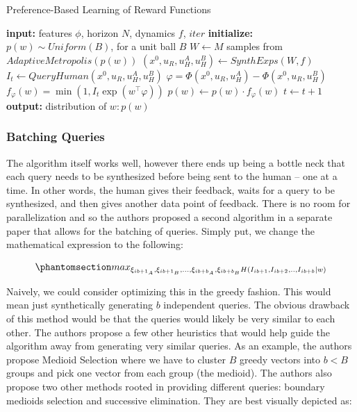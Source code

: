 \documentclass[
  letterpaper,
  numbers=noenddot,
  DIV=11]{scrreprt}
\theoremstyle{definition}
\theoremstyle{plain}
\theoremstyle{plain}
\theoremstyle{remark}
\begin{document}
\begin{algorithm}[H]
\caption{Preference-Based Learning of Reward Functions}
\label{alg-design}
\begin{algorithmic}[1]
    \State \textbf{input:} features $\phi$, horizon $N$, dynamics $f$, $iter$
    \State \textbf{initialize:} $p(w) \sim Uniform(B)$, for a unit ball $B$
        \State $W \gets M$ samples from $AdaptiveMetropolis(p(w))$
        \State $(x^0, u_R, u^A_H, u^B_H) \gets SynthExps(W,f)$
        \State $I_t \gets QueryHuman(x^0, u_R, u^A_H, u^B_H)$
        \State $\varphi = \Phi(x^0, u_R, u^A_H) - \Phi(x^0, u_R, u^B_H)$
        \State $f_\varphi(w) = \min(1, I_t\exp(w^\top \varphi))$
        \State $p(w) \gets p(w) \cdot f_\varphi(w)$
        \State $t \gets t+1$
    \EndWhile
    \State \textbf{output:} distribution of $w: p(w)$
\end{algorithmic}
\end{algorithm}

\subsubsection*{Batching Queries}\label{batching-queries}

The algorithm itself works well, however there ends up being a bottle
neck that each query needs to be synthesized before being sent to the
human -- one at a time. In other words, the human gives their feedback,
waits for a query to be synthesized, and then gives another data point
of feedback. There is no room for parallelization and so the authors
proposed a second algorithm in a separate paper that allows for the
batching of queries. Simply put, we change the mathematical expression
to the following:

\begin{equation}\phantomsection\label{eq-eq3.44}{max_{\xi_{ib+1_A}, \xi_{ib+1_B}, ... , \xi_{ib+b_A}, \xi_{ib+b_B} H(I_{ib+1}, I_{ib+2}, .., I_{ib+b} | w)}}\end{equation}

Naively, we could consider optimizing this in the greedy fashion. This
would mean just synthetically generating \(b\) independent queries. The
obvious drawback of this method would be that the queries would likely
be very similar to each other. The authors propose a few other
heuristics that would help guide the algorithm away from generating very
similar queries. As an example, the authors propose Medioid Selection
where we have to cluster \(B\) greedy vectors into \(b < B\) groups and
pick one vector from each group (the medioid). The authors also propose
two other methods rooted in providing different queries: boundary
medioids selection and successive elimination. They are best visually
depicted as:
\end{document}
